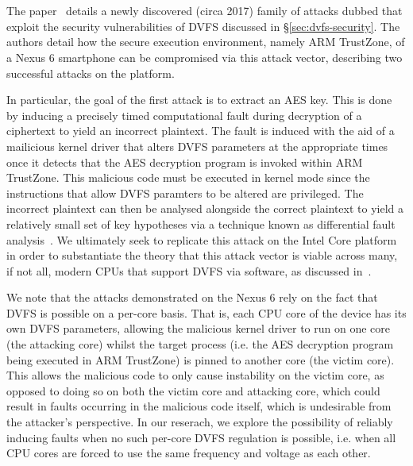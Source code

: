 \section{\clkscrew{}}

The \clkscrew{} paper~\cite{clkscrew} details a newly discovered (circa 2017)
family of attacks dubbed \clkscrew{} that exploit the security vulnerabilities
of DVFS discussed in §\ref{sec:dvfs-security}. The authors detail how the secure
execution environment, namely ARM TrustZone, of a Nexus 6 smartphone can be
compromised via this attack vector, describing two successful attacks on the
platform.

In particular, the goal of the first attack is to extract an AES key. This is
done by inducing a precisely timed computational fault during decryption of a
ciphertext to yield an incorrect plaintext. The fault is induced with the aid of
a mailicious kernel driver that alters DVFS parameters at the appropriate times
once it detects that the AES decryption program is invoked within ARM TrustZone.
This malicious code must be executed in kernel mode since the instructions that
allow DVFS paramters to be altered are privileged. The incorrect plaintext can then be
analysed alongside the correct plaintext to yield a relatively small set of key 
hypotheses via a technique known as differential fault analysis~\cite{tunstallDFA}.
We ultimately seek to replicate this attack on the Intel Core platform in order
to substantiate the theory that this attack vector is viable across many, if not
all, modern CPUs that support DVFS via software, as discussed in~\cite[§6.1]{clkscrew}.

We note that the attacks demonstrated on the Nexus 6 rely on the fact that DVFS
is possible on a per-core basis. That is, each CPU core of the device has its
own DVFS parameters, allowing the malicious kernel driver to run on one core
(the attacking core) whilst the target process (i.e. the AES decryption program
being executed in ARM TrustZone) is pinned to another core (the victim core).
This allows the malicious code to only cause instability on the victim core, as
opposed to doing so on both the victim core and attacking core, which could
result in faults occurring in the malicious code itself, which is undesirable
from the attacker's perspective. In our reserach, we explore the possibility of
reliably inducing faults when no such per-core DVFS regulation is possible,
i.e. when all CPU cores are forced to use the same frequency and voltage as
each other.
